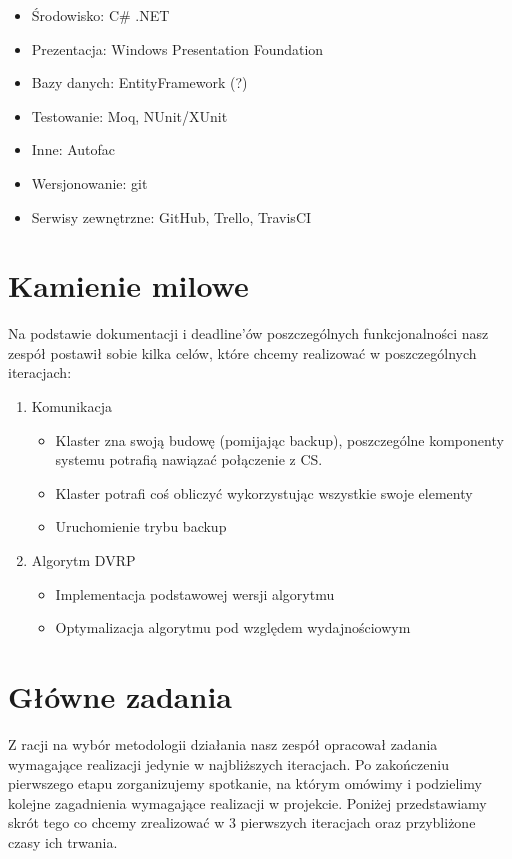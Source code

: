 \documentclass[a4paper]{article}
\begin{document}
	\begin{itemize}
		\item Środowisko: C\# .NET
		\item Prezentacja: Windows Presentation Foundation
		\item Bazy danych: EntityFramework (?)
		\item Testowanie: Moq, NUnit/XUnit
		\item Inne: Autofac
		\item Wersjonowanie: git
		\item Serwisy zewnętrzne: GitHub, Trello, TravisCI
	\end{itemize}
	
	\section{Kamienie milowe}
	Na podstawie dokumentacji i deadline'ów poszczególnych funkcjonalności nasz zespół 
	postawił sobie kilka celów, które chcemy realizować w poszczególnych iteracjach:
	\begin{enumerate}
		\item Komunikacja
		\begin{itemize}
			\item Klaster zna swoją budowę (pomijając backup), poszczególne komponenty systemu potrafią nawiązać połączenie z CS.
		\item Klaster potrafi coś obliczyć wykorzystując wszystkie swoje elementy
		\item Uruchomienie trybu backup
		\end{itemize}
		\item Algorytm DVRP
			\begin{itemize}
				\item Implementacja podstawowej wersji algorytmu
				\item Optymalizacja algorytmu pod względem wydajnościowym
			\end{itemize}		
	\end{enumerate}
	
	\section{Główne zadania}
		Z racji na wybór metodologii działania nasz zespół opracował zadania wymagające realizacji jedynie w najbliższych iteracjach. Po zakończeniu pierwszego etapu zorganizujemy spotkanie, na którym omówimy i podzielimy kolejne zagadnienia wymagające realizacji w projekcie. Poniżej przedstawiamy skrót tego co chcemy zrealizować w 3 pierwszych iteracjach oraz przybliżone czasy ich trwania.
		
\end{document}
